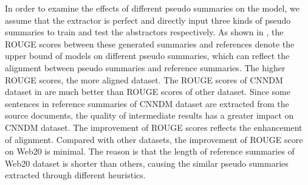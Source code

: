 
In order to examine the effects of different pseudo summaries on the model,
we assume that the extractor is perfect and directly input 
three kinds of pseudo summaries to train and test the abstractors 
respectively.
As shown in , the ROUGE scores between these generated 
summaries and references 
denote the upper bound of models on different pseudo summaries, 
which can reflect the alignment between pseudo summaries and reference summaries.
The higher ROUGE scores, the more aligned dataset.
The ROUGE scores of CNNDM dataset in  are much better than ROUGE scores of other dataset.
Since some sentences in reference summaries of CNNDM dataset are extracted from the source documents,
the quality of intermediate results has a greater impact on CNNDM dataset.
The improvement of ROUGE scores reflects the enhancement of alignment.
Compared with other datasets, the improvement of ROUGE score on Web20 is minimal.
The reason is that the length of reference summaries of Web20 dataset is shorter than others,
causing the similar pseudo summaries extracted through different heuristics.

